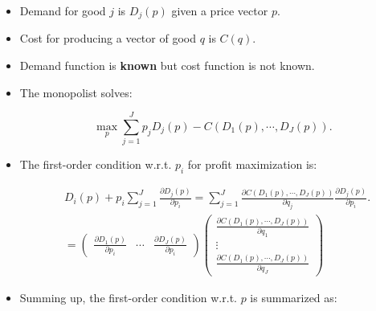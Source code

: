 \documentclass[]{book}
\theoremstyle{definition}
\theoremstyle{definition}
\theoremstyle{definition}
\theoremstyle{remark}
\begin{document}
\begin{itemize}
\item
  Demand for good \(j\) is \(D_j(p)\) given a price vector \(p\).
\item
  Cost for producing a vector of good \(q\) is \(C(q)\).
\item
  Demand function is \textbf{known} but cost function is not known.
\item
  The monopolist solves:

  \begin{equation}
  \max_{p} \sum_{j = 1}^J p_j D_j(p) - C(D_1(p), \cdots, D_J(p)).
  \end{equation}
\item
  The first-order condition w.r.t. \(p_i\) for profit maximization is:

  \begin{equation}
  \begin{split}
  &D_i(p) + p_i \sum_{j = 1}^J \frac{\partial D_j(p)}{\partial p_i} = \sum_{j = 1}^J \frac{\partial C(D_1(p), \cdots, D_J(p))}{\partial q_j} \frac{\partial D_j(p)}{\partial p_i}.\\
  &= 
  \begin{pmatrix}
  \frac{\partial D_1(p)}{\partial p_i} & \cdots & \frac{\partial D_J(p)}{\partial p_i}
  \end{pmatrix}
  \begin{pmatrix}
  \frac{\partial C(D_1(p), \cdots, D_J(p))}{\partial q_1}\\
  \vdots\\
  \frac{\partial C(D_1(p), \cdots, D_J(p))}{\partial q_J}
  \end{pmatrix}
  \end{split}
  \end{equation}
\item
  Summing up, the first-order condition w.r.t. \(p\) is summarized as:


\end{itemize}
\end{document}
